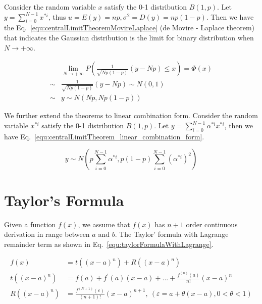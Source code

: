 \documentclass[runningheads,openany]{xhlPaper}
\begin{document}
Consider the random variable $x$ satisfy the 0-1 distribution $B\left(1, p\right)$. Let $y = \sum\limits_{i = 0}^{N - 1} {{x^{*i}}} $, thus $u=E\left(y\right)=np, \sigma ^ 2 = D\left(y\right)=np\left(1-p\right)$. Then we have the Eq.~\ref{equ:centralLimitTheoremMovireLaplace} (de Movire - Laplace theorem) that indicates the Gaussian distribution is the limit for binary distribution when $N\to  + \infty$.

\begin{equation}
\label{equ:centralLimitTheoremMovireLaplace}
\begin{aligned}
&\mathop {\lim }\limits_{N \to  + \infty } P\left( {\frac{1}{{\sqrt {Np\left( {1 - p} \right)} }}\left( {y - Np} \right) \le x} \right) = \Phi \left( x \right)\\
 \sim& \frac{1}{{\sqrt {Np\left( {1 - p} \right)} }}\left( {y - Np} \right) \sim N\left( {0,1} \right)\\
 \sim& y \sim N\left( {Np,Np\left( {1 - p} \right)} \right)
\end{aligned}
\end{equation}

We further extend the theorems to linear combination form. Consider the random variable $x^{*i}$ satisfy the 0-1 distribution $B\left(1, p\right)$. Let $y = \sum\limits_{i = 0}^{N - 1} {{\alpha ^{*i}}{x^{*i}}} $, then we have Eq.~\ref{equ:centralLimitTheorem_linear_combination_form}.

\begin{equation}
\label{equ:centralLimitTheorem_linear_combination_form}
y \sim N\left( {p\sum\limits_{i = 0}^{N - 1} {{\alpha ^{*i}}} ,p\left( {1 - p} \right)\sum\limits_{i = 0}^{N - 1} {{{\left( {{\alpha ^{*i}}} \right)}^2}} } \right)
\end{equation}

\section{Taylor's Formula}
Given a function $f\left(x\right)$, we assume that $f\left(x\right)$ has $n + 1$ order continuous derivation in range between $a$ and $b$. The Taylor' formula with Lagrange remainder term as shown in Eq.~\ref{equ:taylorFormulaWithLagrange}.

\begin{equation}
\label{equ:taylorFormulaWithLagrange}
\begin{aligned}
f\left( x \right) &= t\left( {{{\left( {x - a} \right)}^n}} \right) + R\left( {{{\left( {x - a} \right)}^n}} \right)\\
t\left( {{{\left( {x - a} \right)}^n}} \right) &= f\left( a \right) + {f^{'}}\left( a \right)\left( {x - a} \right) + ... + \frac{{{f^{(n)}}\left( a \right)}}{{n!}}{\left( {x - a} \right)^n}\\
R\left( {{{\left( {x - a} \right)}^n}} \right) &= \frac{{{f^{(N + 1)}}\left( \varepsilon  \right)}}{{\left( {n + 1} \right)!}}{\left( {x - a} \right)^{n + 1}},\ \left( {\varepsilon  = a + \theta \left( {x - a} \right),0 < \theta  < 1} \right)
\end{aligned}
\end{equation}
\end{document}
